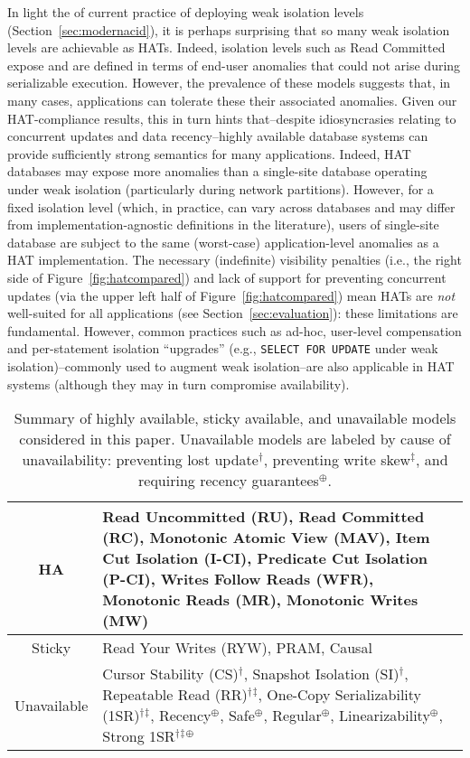 {In light the of current practice of deploying weak isolation levels
(Section~\ref{sec:modernacid}), it is perhaps surprising that so many
weak isolation levels are achievable as HATs. Indeed, isolation levels
such as Read Committed expose and are defined in terms of end-user
anomalies that could not arise during serializable execution. However,
the prevalence of these models suggests that, in many cases,
applications can tolerate these their associated anomalies. Given our
HAT-compliance results, this in turn hints that--despite
idiosyncrasies relating to concurrent updates and data recency--highly
available database systems can provide sufficiently strong semantics
for many applications. Indeed, HAT databases may expose more anomalies
than a single-site database operating under weak isolation
(particularly during network partitions). However, for a fixed
isolation level (which, in practice, can vary across databases and may
differ from implementation-agnostic definitions in the literature),
users of single-site database are subject to the same (worst-case)
application-level anomalies as a HAT implementation. The necessary
(indefinite) visibility penalties (i.e., the right side of
Figure~\ref{fig:hatcompared}) and lack of support for preventing
concurrent updates (via the upper left half of
Figure~\ref{fig:hatcompared}) mean HATs are \textit{not} well-suited
for all applications (see Section~\ref{sec:evaluation}): these
limitations are fundamental. However, common practices such as ad-hoc,
user-level compensation and per-statement isolation ``upgrades''
(e.g., \texttt{SELECT FOR UPDATE} under weak isolation)--commonly used
to augment weak isolation--are also applicable in HAT systems
(although they may in turn compromise availability).

 \newcommand{\lostupdate}{$^\dagger$}
 \newcommand{\rwskew}{$^\ddagger$}
 \newcommand{\linearizable}{$^\oplus$}

\begin{table}[t!]
\begin{tabular}{| c | p{6cm} | }\hline
HA & Read Uncommitted (RU), Read Committed (RC), Monotonic Atomic View
(MAV), Item Cut Isolation (I-CI), Predicate Cut Isolation (P-CI),
Writes Follow Reads (WFR), Monotonic Reads (MR), Monotonic Writes
(MW)\\\hline Sticky & Read Your Writes (RYW), PRAM, Causal\\\hline
Unavailable & Cursor Stability (CS)\lostupdate, Snapshot Isolation
(SI)\lostupdate, Repeatable Read (RR)\lostupdate\rwskew, One-Copy
Serializability (1SR)\lostupdate\rwskew, Recency\linearizable,
Safe\linearizable, Regular\linearizable, Linearizability\linearizable,
Strong 1SR\lostupdate\rwskew\linearizable \\\hline
\end{tabular}
\caption{Summary of highly available, sticky available, and
  unavailable models considered in this paper. Unavailable models are
  labeled by cause of unavailability: preventing lost
  update\lostupdate, preventing write skew\rwskew, and requiring
  recency guarantees\linearizable.}
\label{table:hatcompared}
\end{table}

}
